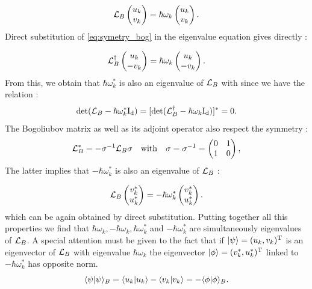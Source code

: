 \begin{equation}
    \mathcal{L}_B \begin{pmatrix}
        u_k \\
        v_k
    \end{pmatrix} = \hbar\omega_k \begin{pmatrix}
        u_k \\
        v_k
    \end{pmatrix}.
\end{equation}
Direct substitution of \autoref{eq:symetry_bog} in the eigenvalue equation gives directly :

\begin{equation}
    \mathcal{L}_B^\dagger \begin{pmatrix}
        u_k \\
        -v_k
    \end{pmatrix} = \hbar\omega_k \begin{pmatrix}
        u_k \\
        -v_k
    \end{pmatrix}.
\end{equation}
From this, we obtain that $\hbar\omega_k^*$ is also an eigenvalue of $\mathcal{L}_B$ with since we have the relation :
\begin{equation}
    \mathrm{det}(\mathcal{L}_B-\hbar\omega_k^*\mathrm{I_d}) = [\mathrm{det}(\mathcal{L}_B^\dagger-\hbar\omega_k\mathrm{I_d})]^* = 0.
\end{equation}
The Bogoliubov matrix as well as its adjoint operator also respect the symmetry :
\begin{equation}
    \mathcal{L}_B^* = -\sigma^{-1} \mathcal{L}_B \sigma \ \ \ \mathrm{with} \ \ \ \sigma = \sigma^{-1} =\begin{pmatrix}
        0 & 1 \\
        1 & 0
    \end{pmatrix},
    \label{eq:symetry_bog_2}
\end{equation}
The latter implies that $-\hbar\omega_k^*$ is also an eigenvalue of $\mathcal{L}_B$ :

\begin{equation}
    \mathcal{L}_B \begin{pmatrix}
        v_k^* \\
        u_k^*
    \end{pmatrix} = -\hbar\omega_k^* \begin{pmatrix}
        v_k^* \\
        u_k^*
    \end{pmatrix}.
\end{equation}
which can be again obtained by direct substitution. Putting together all this properties we find that $\hbar \omega_k, -\hbar \omega_k, \hbar\omega_k^*$ and $-\hbar\omega_k^*$ are simultaneously eigenvalues of $\mathcal{L}_B$.
A special attention must be given to the fact that if $\ket{\psi}=(u_k,v_k)^\mathrm{T}$ is an eigenvector of $\mathcal{L}_B$ with eigenvalue $\hbar\omega_k$ the eigenvector $\ket{\phi}=(v_k^*,u_k^*)^\mathrm{T}$ linked to $-\hbar\omega_k^*$ has opposite norm.
\begin{equation}
    \langle \psi| \psi \rangle_B = \bra{u_k}\ket{u_k} - \bra{v_k}\ket{v_k} = -\langle \phi| \phi \rangle_B.
\end{equation}
\bigskip


